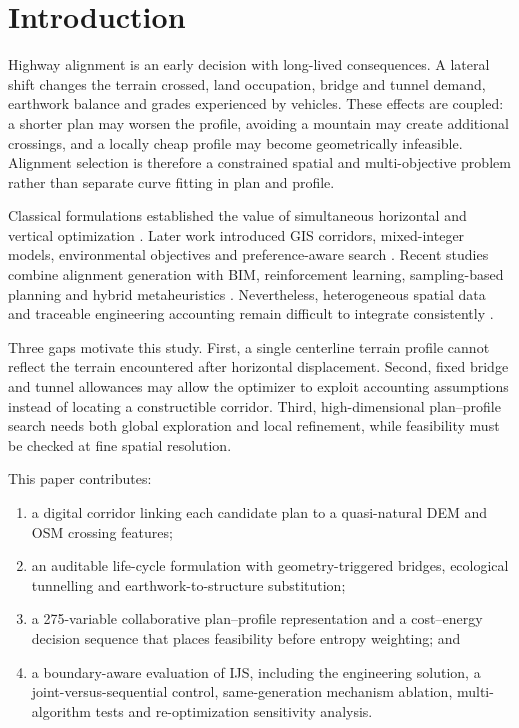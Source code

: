 \documentclass[preprint,12pt]{elsarticle}
\begin{document}
\linenumbers

\section{Introduction}

Highway alignment is an early decision with long-lived consequences. A lateral shift changes the terrain crossed, land occupation, bridge and tunnel demand, earthwork balance and grades experienced by vehicles. These effects are coupled: a shorter plan may worsen the profile, avoiding a mountain may create additional crossings, and a locally cheap profile may become geometrically infeasible. Alignment selection is therefore a constrained spatial and multi-objective problem rather than separate curve fitting in plan and profile.

Classical formulations established the value of simultaneous horizontal and vertical optimization \cite{chew1989,jong2003}. Later work introduced GIS corridors, mixed-integer models, environmental objectives and preference-aware search \cite{kang2012,mondal2015,hirpa2016,vazquez2018,akhmet2022}. Recent studies combine alignment generation with BIM, reinforcement learning, sampling-based planning and hybrid metaheuristics \cite{han2023,he2023,alhadad2024,pu2024,pu2026}. Nevertheless, heterogeneous spatial data and traceable engineering accounting remain difficult to integrate consistently \cite{songreview2023}.

Three gaps motivate this study. First, a single centerline terrain profile cannot reflect the terrain encountered after horizontal displacement. Second, fixed bridge and tunnel allowances may allow the optimizer to exploit accounting assumptions instead of locating a constructible corridor. Third, high-dimensional plan--profile search needs both global exploration and local refinement, while feasibility must be checked at fine spatial resolution.

This paper contributes:

\begin{enumerate}[leftmargin=*,label=(\arabic*)]
\item a digital corridor linking each candidate plan to a quasi-natural DEM and OSM crossing features;
\item an auditable life-cycle formulation with geometry-triggered bridges, ecological tunnelling and earthwork-to-structure substitution;
\item a 275-variable collaborative plan--profile representation and a cost--energy decision sequence that places feasibility before entropy weighting; and
\item a boundary-aware evaluation of IJS, including the engineering solution, a joint-versus-sequential control, same-generation mechanism ablation, multi-algorithm tests and re-optimization sensitivity analysis.
\end{enumerate}
\end{document}
